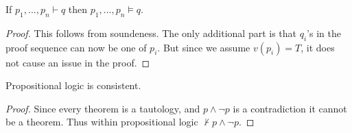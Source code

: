 \begin{corollary}
  If $p_1,...,p_n \vdash q$ then $p_1,...,p_n \vDash q$.
\end{corollary}
\begin{proof}
  This follows from soundeness. The only additional part is that $q_i$'s in the proof sequence can now be one of $p_i$. But since we assume $v(p_i) = T$, it does not cause an issue in the proof.  
\end{proof}
\begin{corollary}
  Propositional logic is consistent.
\end{corollary}
\begin{proof}
  Since every theorem is a tautology, and $p\land \lnot p$ is a contradiction it cannot be a theorem. Thus within propositional logic $\nvdash p\land \lnot p$.
\end{proof}
